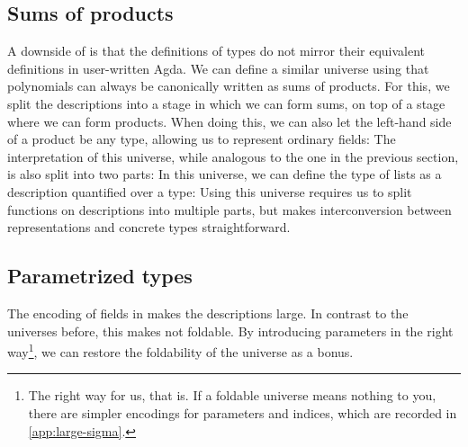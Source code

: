 \subsection{Sums of products}\label{ssec:background-sop}
A downside of  is that the definitions of types do not mirror their equivalent definitions in user-written Agda. We can define a similar universe using that polynomials can always be canonically written as sums of products. For this, we split the descriptions into a stage in which we can form sums, on top of a stage where we can form products.
When doing this, we can also let the left-hand side of a product be any type, allowing us to represent ordinary fields:
The interpretation of this universe, while analogous to the one in the previous section, is also split into two parts:
In this universe, we can define the type of lists as a description quantified over a type:
Using this universe requires us to split functions on descriptions into multiple parts, but makes interconversion between representations and concrete types straightforward.

\subsection{Parametrized types}\label{ssec:background-par}
The encoding of fields in  makes the descriptions large. In contrast to the universes before, this makes  not foldable. By introducing parameters in the right way\footnote{The right way for us, that is. If a foldable universe means nothing to you, there are simpler encodings for parameters and indices, which are recorded in \autoref{app:large-sigma}.}, we can restore the foldability of the universe as a bonus.

